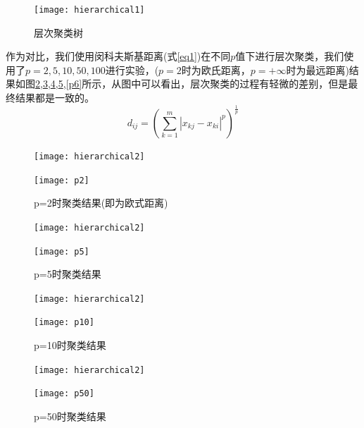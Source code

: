 \documentclass[cn]{elegantbook}
\begin{document}
\begin{figure}[!h]
	\centering
	\texttt{[image: hierarchical1]}
	\caption{\label{res6}层次聚类树}
\end{figure}

作为对比，我们使用闵科夫斯基距离(式\ref{eq1})在不同$p$值下进行层次聚类，我们使用了$p=2,5,10,50,100$进行实验，($p=2$时为欧氏距离，$p=+\infty$时为最远距离)结果如图\ref{p2},\ref{p3},\ref{p4},\ref{p5},\ref{p6}所示，从图中可以看出，层次聚类的过程有轻微的差别，但是最终结果都是一致的。
\begin{equation}
\label{eq1}
d_{ij}=\left(\sum_{k=1}^{m}\left|x_{kj}-x_{ki}\right|^p\right)^{\frac{1}{p}}
\end{equation}

\begin{figure}[!h]
	\centering
	\begin{minipage}{0.48\linewidth}
		\centering
		\texttt{[image: hierarchical2]}
	\end{minipage}
	\begin{minipage}{0.48\linewidth}
		\centering
		\texttt{[image: p2]}
	\end{minipage}
	\caption{\label{p2}p=2时聚类结果(即为欧式距离)}
\end{figure}

\begin{figure}[!h]
	\centering
	\begin{minipage}{0.48\linewidth}
		\centering
		\texttt{[image: hierarchical2]}
	\end{minipage}
	\begin{minipage}{0.48\linewidth}
		\centering
		\texttt{[image: p5]}
	\end{minipage}
	\caption{\label{p3}p=5时聚类结果}
\end{figure}

\begin{figure}[!h]
	\centering
	\begin{minipage}{0.48\linewidth}
		\centering
		\texttt{[image: hierarchical2]}
	\end{minipage}
	\begin{minipage}{0.48\linewidth}
		\centering
		\texttt{[image: p10]}
	\end{minipage}
	\caption{\label{p4}p=10时聚类结果}
\end{figure}

\begin{figure}[!h]
	\centering
	\begin{minipage}{0.48\linewidth}
		\centering
		\texttt{[image: hierarchical2]}
	\end{minipage}
	\begin{minipage}{0.48\linewidth}
		\centering
		\texttt{[image: p50]}
	\end{minipage}
	\caption{\label{p5}p=50时聚类结果}
\end{figure}
\end{document}
